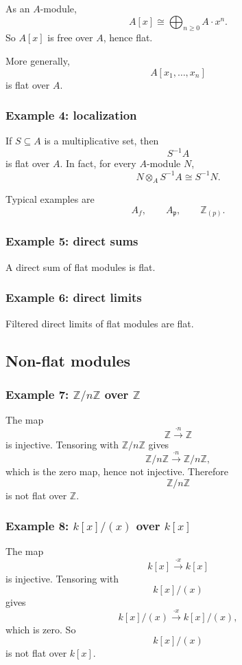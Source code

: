 \documentclass[12pt,a4paper]{article}
\theoremstyle{notespace}
\begin{document}
As an \(A\)-module,
\[
A[x]\cong \bigoplus_{n\ge 0} A\cdot x^n.
\]
So \(A[x]\) is free over \(A\), hence flat.

More generally,
\[
A[x_1,\dots,x_n]
\]
is flat over \(A\).

\subsubsection*{Example 4: localization}

If \(S\subseteq A\) is a multiplicative set, then
\[
S^{-1}A
\]
is flat over \(A\). In fact, for every \(A\)-module \(N\),
\[
N\otimes_A S^{-1}A \cong S^{-1}N.
\]

Typical examples are
\[
A_f,\qquad A_{\mathfrak p},\qquad \mathbb Z_{(p)}.
\]

\subsubsection*{Example 5: direct sums}

A direct sum of flat modules is flat.

\subsubsection*{Example 6: direct limits}

Filtered direct limits of flat modules are flat.

\subsection{Non-flat modules}

\subsubsection*{Example 7: \(\mathbb Z/n\mathbb Z\) over \(\mathbb Z\)}

The map
\[
\mathbb Z \xrightarrow{\cdot n} \mathbb Z
\]
is injective. Tensoring with \(\mathbb Z/n\mathbb Z\) gives
\[
\mathbb Z/n\mathbb Z \xrightarrow{\cdot n} \mathbb Z/n\mathbb Z,
\]
which is the zero map, hence not injective. Therefore
\[
\mathbb Z/n\mathbb Z
\]
is not flat over \(\mathbb Z\).

\subsubsection*{Example 8: \(k[x]/(x)\) over \(k[x]\)}

The map
\[
k[x]\xrightarrow{\cdot x} k[x]
\]
is injective. Tensoring with
\[
k[x]/(x)
\]
gives
\[
k[x]/(x)\xrightarrow{\cdot x} k[x]/(x),
\]
which is zero. So
\[
k[x]/(x)
\]
is not flat over \(k[x]\).
\end{document}
